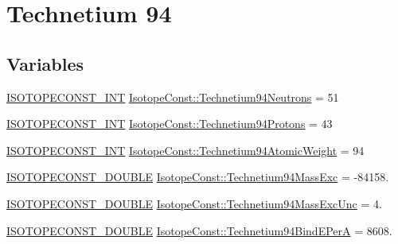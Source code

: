 \hypertarget{group___isotope_const-_technetium-_tc94}{}\section{Technetium 94}
\label{group___isotope_const-_technetium-_tc94}
\subsection*{Variables}
\begin{DoxyCompactItemize}
\item 
\mbox{\hyperlink{group___isotope_const-_macros_ga5f18360b3e99483a35c32d789e62621c}{I\+S\+O\+T\+O\+P\+E\+C\+O\+N\+S\+T\+\_\+\+I\+NT}} \mbox{\hyperlink{group___isotope_const-_technetium-_tc94_gaf1a8fa77cbbb43515ccc400b879eac49}{Isotope\+Const\+::\+Technetium94\+Neutrons}} = 51
\item 
\mbox{\hyperlink{group___isotope_const-_macros_ga5f18360b3e99483a35c32d789e62621c}{I\+S\+O\+T\+O\+P\+E\+C\+O\+N\+S\+T\+\_\+\+I\+NT}} \mbox{\hyperlink{group___isotope_const-_technetium-_tc94_ga0bd83b1283ce721a7dd5d72ffa9dd307}{Isotope\+Const\+::\+Technetium94\+Protons}} = 43
\item 
\mbox{\hyperlink{group___isotope_const-_macros_ga5f18360b3e99483a35c32d789e62621c}{I\+S\+O\+T\+O\+P\+E\+C\+O\+N\+S\+T\+\_\+\+I\+NT}} \mbox{\hyperlink{group___isotope_const-_technetium-_tc94_ga5a79eea9e3d6f19c8c211399d994fd23}{Isotope\+Const\+::\+Technetium94\+Atomic\+Weight}} = 94
\item 
\mbox{\hyperlink{group___isotope_const-_macros_ga8f45a7272ce02c0b4c65c44636ed719a}{I\+S\+O\+T\+O\+P\+E\+C\+O\+N\+S\+T\+\_\+\+D\+O\+U\+B\+LE}} \mbox{\hyperlink{group___isotope_const-_technetium-_tc94_ga36bbe866e0dd091b8cd64563b8cb890f}{Isotope\+Const\+::\+Technetium94\+Mass\+Exc}} = -\/84158.
\item 
\mbox{\hyperlink{group___isotope_const-_macros_ga8f45a7272ce02c0b4c65c44636ed719a}{I\+S\+O\+T\+O\+P\+E\+C\+O\+N\+S\+T\+\_\+\+D\+O\+U\+B\+LE}} \mbox{\hyperlink{group___isotope_const-_technetium-_tc94_ga701b3a04e6844a1652d8b0352451c7ba}{Isotope\+Const\+::\+Technetium94\+Mass\+Exc\+Unc}} = 4.
\item 
\mbox{\hyperlink{group___isotope_const-_macros_ga8f45a7272ce02c0b4c65c44636ed719a}{I\+S\+O\+T\+O\+P\+E\+C\+O\+N\+S\+T\+\_\+\+D\+O\+U\+B\+LE}} \mbox{\hyperlink{group___isotope_const-_technetium-_tc94_ga056c51a776eee70992062d8fa5f7586f}{Isotope\+Const\+::\+Technetium94\+Bind\+E\+PerA}} = 8608.
\item 

\end{DoxyCompactItemize}
